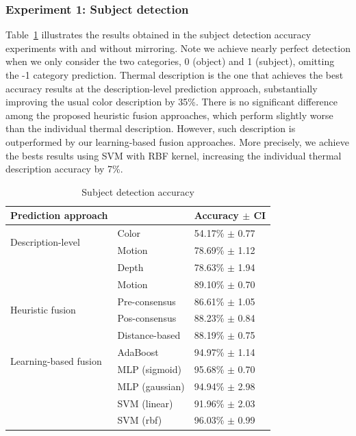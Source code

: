\documentclass[10pt,twocolumn,letterpaper]{article}
\begin{document}


\subsubsection{Experiment 1: Subject detection}

Table~\ref{tab:subject_detection_accuracy} illustrates the results obtained in the subject detection accuracy experiments with and without mirroring. Note we achieve nearly perfect  detection when we only consider the two categories, 0 (object) and 1 (subject), omitting the -1 category prediction. Thermal description is the one that achieves the best accuracy results at the description-level prediction approach, substantially improving the usual color description by 35\%. There is no significant difference among the proposed heuristic fusion approaches, which perform slightly worse than the individual thermal description. However, such description is outperformed by our learning-based fusion approaches. More precisely, we achieve the bests results using SVM with RBF kernel, increasing the individual thermal description accuracy by 7\%.

\begin{table}[ht]
\caption{Subject detection accuracy}
\begin{center}
\begin{tabular}{lll}
    \hline
    Prediction approach & & Accuracy $\pm$ CI \\
    \hline
    \multirow{2}{*}{Description-level} & Color & 54.17\% $\pm$ 0.77 \\
    & Motion & 78.69\% $\pm$ 1.12\\
    & Depth & 78.63\% $\pm$ 1.94\\
    & Motion & 89.10\% $\pm$ 0.70\\
    \hline
    \multirow{2}{*}{Heuristic fusion} & Pre-consensus & 86.61\% $\pm$ 1.05 \\
    & Pos-consensus & 88.23\% $\pm$ 0.84 \\
    & Distance-based & 88.19\% $\pm$ 0.75 \\
    \hline
    \multirow{2}{*}{Learning-based fusion} & AdaBoost & 94.97\% $\pm$ 1.14 \\
    & MLP (sigmoid) & 95.68\% $\pm$ 0.70 \\
    & MLP (gaussian) & 94.94\% $\pm$ 2.98 \\
    & SVM (linear) & 91.96\% $\pm$ 2.03 \\
    & SVM (rbf) & 96.03\% $\pm$ 0.99 \\
    \hline
\end{tabular}
\end{center}
\label{tab:subject_detection_accuracy}
\end{table}
\end{document}
